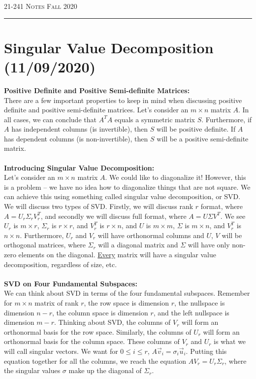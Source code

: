 \documentclass[12pt]{amsart}
\begin{document}
\thispagestyle{empty}

{\scshape 21-241} \hfill {\scshape \Large Notes} \hfill {\scshape Fall 2020}
\medskip
\hrule
\bigskip

\section*{Singular Value Decomposition (11/09/2020)}
\textbf{Positive Definite and Positive Semi-definite Matrices:}\\
There are a few important properties to keep in mind when discussing positive definite and positive semi-definite matrices. Let's consider an $m \times n$ matrix $A$. In all cases, we can conclude that $A^TA$ equals a symmetric matrix $S$. Furthermore, if $A$ has independent columns (is invertible), then $S$ will be positive definite. If $A$ has dependent columns (is non-invertible), then $S$ will be a positive semi-definite matrix.
\\ \\
\textbf{Introducing Singular Value Decomposition:}\\
Let's consider an $m \times n$ matrix $A$. We could like to diagonalize it! However, this is a problem -- we have no idea how to diagonalize things that are not square. We can achieve this using something called singular value decomposition, or SVD. We will discuss two types of SVD. Firstly, we will discuss rank $r$ format, where $A = U_r \Sigma_r V^T_r$, and secondly we will discuss full format, where $A = U \Sigma V^T$. We see $U_r$ is $m \times r$, $\Sigma_r$ is $r \times r$, and $V^T_r$ is $r \times n$, and $U$ is $m \times m$, $\Sigma$ is $m \times n$, and $V^T_r$ is $n \times n$. Furthermore, $U_r$ and $V_r$ will have orthonormal columns and $U$, $V$ will be orthogonal matrices, where $\Sigma_r$ will a diagonal matrix and $\Sigma$ will have only non-zero elements on the diagonal. \underline{Every} matrix will have a singular value decomposition, regardless of size, etc.\\
\\
\textbf{SVD on Four Fundamental Subspaces:}\\
We can think about SVD in terms of the four fundamental subspaces. Remember for $m \times n$ matrix of rank $r$, the row space is dimension $r$, the nullspace is dimension $n - r$, the column space is dimension $r$, and the left nullspace is dimension $m - r$. Thinking about SVD, the columns of $V_r$ will form an orthonormal basis for the row space. Similarly, the columns of $U_r$ will form an orthonormal basis for the column space. These columns of $V_r$ and $U_r$ is what we will call singular vectors. We want for $0 \leq i \leq r$, $A\vec{v}_i = \sigma_i \vec{u}_i$. Putting this equation together for all the columns, we reach the equation $AV_r = U_r\Sigma_r$, where the singular values $\sigma$ make up the diagonal of $\Sigma_r$.\\ 
\end{document}
